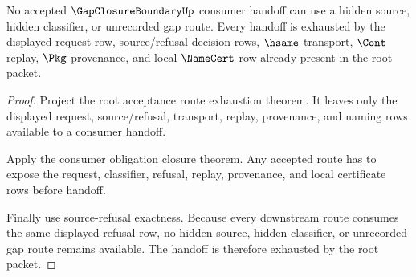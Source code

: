 \begin{theorem}
\label{thm:gap-closure-boundary-refusal-handoff-exhaustion}
No accepted $\GapClosureBoundaryUp$ consumer handoff can use a hidden source, hidden classifier, or unrecorded gap route. Every handoff is exhausted by the displayed request row, source/refusal decision rows, $\hsame$ transport, $\Cont$ replay, $\Pkg$ provenance, and local $\NameCert$ row already present in the root packet.
\end{theorem}
\begin{proof}
Project the root acceptance route exhaustion theorem. It leaves only the displayed request, source/refusal, transport, replay, provenance, and naming rows available to a consumer handoff.

Apply the consumer obligation closure theorem. Any accepted route has to expose the request, classifier, refusal, replay, provenance, and local certificate rows before handoff.

Finally use source-refusal exactness. Because every downstream route consumes the same displayed refusal row, no hidden source, hidden classifier, or unrecorded gap route remains available. The handoff is therefore exhausted by the root packet.
\end{proof}
